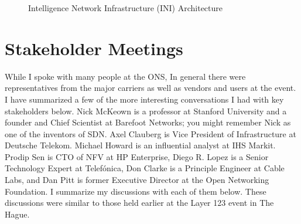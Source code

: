 \documentclass[11pt, oneside]{article}   	%
\begin{document}
\begin{figure}
\caption{Intelligence Network Infrastructure (INI) Architecture}
\label{fig:INI_architecture}
\end{figure}


\section{Stakeholder Meetings} 
\label{sec:stakeholders}
While I spoke with many people at the ONS, In general there were representatives from the major carriers as well as vendors and users at the event. I have summarized a few of the more interesting conversations I had with key stakeholders below. Nick McKeown is a professor at Stanford University and a founder and Chief Scientist at Barefoot Networks; you might remember Nick as one of the inventors of SDN. Axel  Clauberg is Vice President of Infrastructure at Deutsche Telekom. Michael Howard is an influential analyst at IHS Markit. Prodip Sen is CTO of NFV at HP Enterprise, Diego R. Lopez is a Senior Technology Expert at Telef\'onica, Don Clarke is a Principle Engineer at Cable Labs, and Dan Pitt is former Executive Director at the Open Networking Foundation. I summarize my discussions with each of them below. These discussions were similar to those held earlier at the Layer 123 event in The Hague. 
\end{document}
